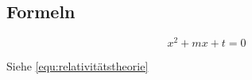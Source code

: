 \subsection{Formeln}\label{subsec:formulas}

\begin{equation}\label{equ:relativitätstheorie}
	x^2 + mx + t = 0
\end{equation}

Siehe \autoref{equ:relativitätstheorie}